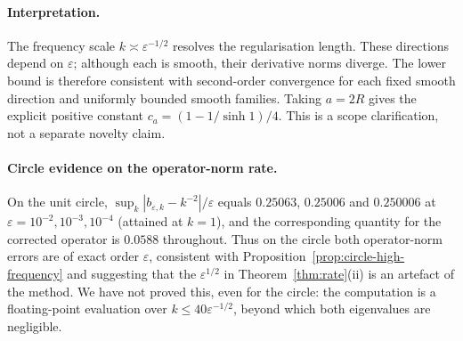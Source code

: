 \documentclass[11pt,a4paper]{article}
\theoremstyle{definition}\newtheorem{definition}[theorem]{Definition}
\theoremstyle{remark}\newtheorem{remark}[theorem]{Remark}
\newcommand{\eps}{\varepsilon}
\begin{document}
\paragraph{Interpretation.}
The frequency scale $k\asymp\varepsilon^{-1/2}$ resolves the
regularisation length.  These directions depend on $\varepsilon$;
although each is smooth, their derivative norms diverge.  The lower
bound is therefore consistent with second-order convergence for
each fixed smooth direction and uniformly bounded smooth families.
Taking $a=2R$ gives the explicit positive constant
$c_a=(1-1/\sinh1)/4$.  This is a scope clarification, not a separate
novelty claim.

\paragraph{Circle evidence on the operator-norm rate.} On the unit circle, $\sup_k|b_{\eps,k}-k^{-2}|/\eps$ equals $0.25063$, $0.25006$ and $0.250006$ at $\eps=10^{-2},10^{-3},10^{-4}$ (attained at $k=1$), and the corresponding quantity for the corrected operator is $0.0588$ throughout. Thus on the circle both operator-norm errors are of exact order $\eps$, consistent with Proposition~\ref{prop:circle-high-frequency} and suggesting that the $\eps^{1/2}$ in Theorem~\ref{thm:rate}(ii) is an artefact of the method. We have not proved this, even for the circle: the computation is a floating-point evaluation over $k\le40\eps^{-1/2}$, beyond which both eigenvalues are negligible.
\end{document}
